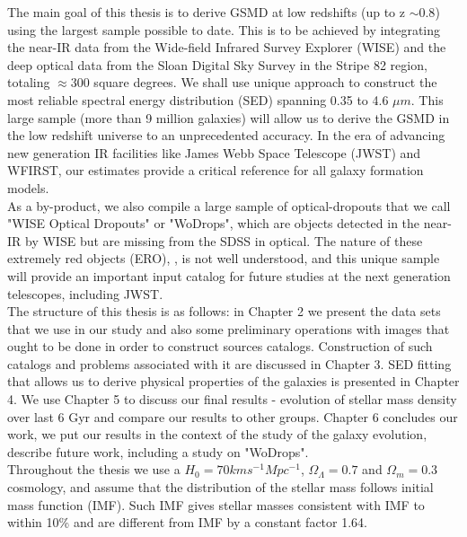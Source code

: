 The main goal of this thesis is to derive GSMD at low redshifts (up to z $\sim0.8$) using the largest sample possible to date. This is to be achieved by integrating the near-IR data from the Wide-field Infrared Survey Explorer (WISE) \citep{Wright2010} and the deep optical data from the Sloan Digital Sky Survey in the Stripe 82 region, totaling $\approx300 $ square degrees. We shall use unique approach to construct the most reliable spectral energy distribution (SED) spanning 0.35 to 4.6 $\mu m$. This large sample (more than 9 million galaxies) will allow us to derive the GSMD in the low redshift universe to an unprecedented accuracy. In the era of advancing new generation IR facilities like James Webb Space Telescope (JWST) and WFIRST, our estimates provide a critical reference for all galaxy formation models.\\

As a by-product, we also compile a large sample of optical-dropouts that we call "WISE Optical Dropouts" or "WoDrops", which are objects detected in the near-IR by WISE but are missing from the SDSS in optical. The nature of these extremely red objects (ERO), \citep{Graham1996a}, \citep{Yan2004} is not well understood, and this unique sample will provide an important input catalog for future studies at the next generation telescopes, including JWST.\\

The structure of this thesis is as follows:
in Chapter 2 we present the data sets that we use in our study and also some preliminary operations with images that ought to be done in order to construct sources catalogs. Construction of such catalogs and problems associated with it are discussed in Chapter 3. SED fitting that allows us to derive physical properties of the galaxies is presented in Chapter 4. We use Chapter 5 to discuss our final results - evolution of stellar mass density over last 6 Gyr and compare our results to other groups. Chapter 6 concludes our work, we put our results in the context of the study of the galaxy evolution, describe future work, including a study on "WoDrops".\\

Throughout the thesis we use a $H_{0}=70 km s^{-1}Mpc^{-1}$, $\Omega_{\Lambda}=0.7$ and $\Omega_{m}=0.3$ cosmology, and assume that the distribution of the stellar mass follows \citep{2003PASP..115..763C} initial mass function (IMF). Such IMF gives stellar masses consistent with \citep{2001MNRAS.322..231K} IMF to within 10\% and are different from \citep{1955ApJ...121..161S} IMF by a constant factor 1.64.





